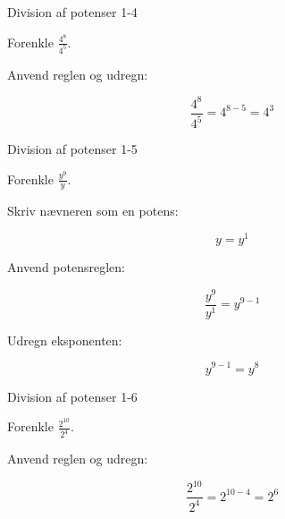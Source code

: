 \documentclass{article}
\begin{document}
\newpage

\begin{exercise}{Division af potenser 1-4}

Forenkle $\frac{4^8}{4^5}$.


\hint

Anvend reglen og udregn:

\hint
\[
\frac{4^8}{4^5} = 4^{8-5} = 4^3
\]

\end{exercise}

\newpage

\begin{exercise}{Division af potenser 1-5}

Forenkle $\frac{y^9}{y}$.


\hint

Skriv nævneren som en potens:

\hint
\[
y = y^1
\]

\hint

Anvend potensreglen:

\hint
\[
\frac{y^9}{y^1} = y^{9-1}
\]

\hint

Udregn eksponenten:

\hint
\[
y^{9-1} = y^8
\]

\end{exercise}

\newpage

\begin{exercise}{Division af potenser 1-6}

Forenkle $\frac{2^{10}}{2^4}$.


\hint

Anvend reglen og udregn:

\hint
\[
\frac{2^{10}}{2^4} = 2^{10-4} = 2^6
\]

\end{exercise}
\end{document}
